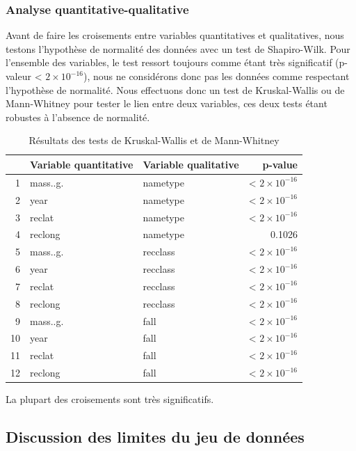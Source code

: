 \documentclass[12pt]{article}
\begin{document}
\subsubsection*{Analyse quantitative-qualitative}
Avant de faire les croisements entre variables quantitatives et qualitatives, nous testons l'hypothèse de normalité des données avec un test de Shapiro-Wilk. Pour l'ensemble des variables, le test ressort toujours comme étant très significatif (p-valeur < $2\times 10^{-16}$), nous ne considérons donc pas les données comme respectant l'hypothèse de normalité. Nous effectuons donc un test de Kruskal-Wallis ou de Mann-Whitney pour tester le lien entre deux variables, ces deux tests étant  robustes à l'absence de normalité.
\begin{table}[H]
\centering
\begin{tabular}{rllr}
  \hline
 & Variable quantitative & Variable qualitative & p-value \\ 
  \hline
1 & mass..g. & nametype & < $2\times 10^{-16}$ \\ 
  2 & year & nametype &< $2\times 10^{-16}$  \\ 
  3 & reclat & nametype &< $2\times 10^{-16}$ \\ 
  4 & reclong & nametype & 0.1026 \\ 
  5 & mass..g. & recclass & < $2\times 10^{-16}$  \\ 
  6 & year & recclass & < $2\times 10^{-16}$  \\ 
  7 & reclat & recclass & < $2\times 10^{-16}$  \\ 
  8 & reclong & recclass & < $2\times 10^{-16}$  \\ 
  9 & mass..g. & fall &< $2\times 10^{-16}$  \\ 
  10 & year & fall & < $2\times 10^{-16}$  \\ 
  11 & reclat & fall &< $2\times 10^{-16}$  \\ 
  12 & reclong & fall &< $2\times 10^{-16}$  \\ 
   \hline
\end{tabular}
\caption{Résultats des tests de Kruskal-Wallis et de Mann-Whitney}
\end{table}
La plupart des croisements sont très significatifs.
\subsection{Discussion des limites du jeu de données}
\end{document}
